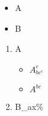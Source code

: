 \documentclass[a4paper,12pt]{article}
\begin{document}
\begin{itemize}
    \item A
    \item B
\end{itemize}

\begin{enumerate}
    \item A
        \begin{itemize}
        \LARGE
            \item $A_{bc^{c}}^{c}$
            \item $A^{bc}$
        \end{itemize}
    \item \LARGE{B\_ax\%}
\end{enumerate}





\end{document}
